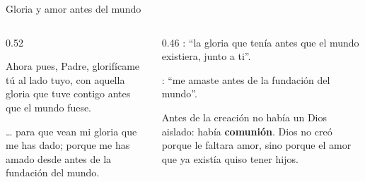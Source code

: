 \begin{frame}{Gloria y amor antes del mundo}
\begin{columns}[t,onlytextwidth]
\begin{column}{0.52\textwidth}
\begin{cita}Ahora pues, Padre, glorifícame tú al lado tuyo, con aquella gloria que tuve contigo antes que el mundo fuese.\end{cita}
\begin{cita}\ldots{} para que vean mi gloria que me has dado; porque me has amado desde antes de la fundación del mundo.\end{cita}
\end{column}
\begin{column}{0.46\textwidth}\scriptsize
{}: ``la gloria que tenía antes que el mundo existiera, junto a ti''.\par\smallskip
{}: ``me amaste antes de la fundación del mundo''.\par\medskip
\begin{tcolorbox}[colback=azul,colframe=dorado,boxrule=1.2pt,arc=3pt,coltext=papiro]
\small Antes de la creación no había un Dios aislado: había \textbf{comunión}. Dios no creó porque le faltara amor, sino porque el amor que ya existía quiso tener hijos.
\end{tcolorbox}
\end{column}
\end{columns}
\end{frame}

